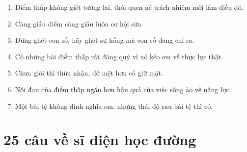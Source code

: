\begin{enumerate}[leftmargin=*]
\item Điểm thấp không giết tương lai, thói quen né trách nhiệm mới làm điều đó.
\item Càng giấu điểm càng giấu luôn cơ hội sửa.
\item Đừng ghét con số, hãy ghét sự hổng mà con số đang chỉ ra.
\item Có những bài điểm thấp rất đáng quý vì nó kéo em về thực lực thật.
\item Chưa giỏi thì thừa nhận, đỡ mệt hơn cố giữ mặt.
\item Nỗi đau của điểm thấp ngắn hơn hậu quả của việc sống ảo về năng lực.
\item Một bài tệ không định nghĩa em, nhưng thái độ sau bài tệ thì có.
\end{enumerate}

\section{25 câu về sĩ diện học đường}
